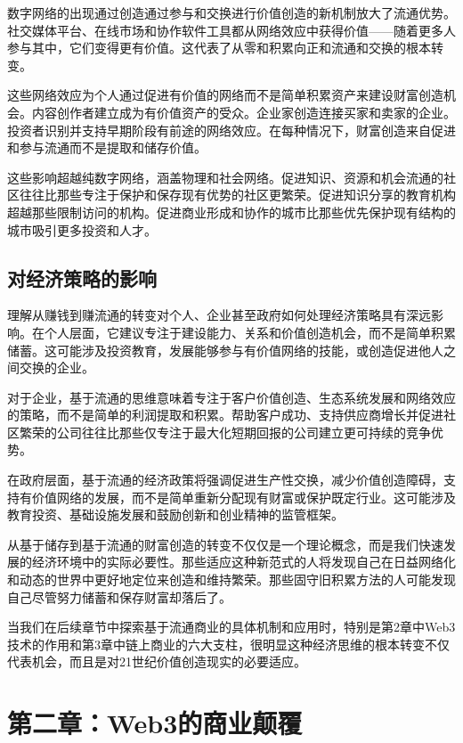 \documentclass[
  Letterpaper,
]{scrbook}
\begin{document}
数字网络的出现通过创造通过参与和交换进行价值创造的新机制放大了流通优势。社交媒体平台、在线市场和协作软件工具都从网络效应中获得价值------随着更多人参与其中，它们变得更有价值。这代表了从零和积累向正和流通和交换的根本转变。

这些网络效应为个人通过促进有价值的网络而不是简单积累资产来建设财富创造机会。内容创作者建立成为有价值资产的受众。企业家创造连接买家和卖家的企业。投资者识别并支持早期阶段有前途的网络效应。在每种情况下，财富创造来自促进和参与流通而不是提取和储存价值。

这些影响超越纯数字网络，涵盖物理和社会网络。促进知识、资源和机会流通的社区往往比那些专注于保护和保存现有优势的社区更繁荣。促进知识分享的教育机构超越那些限制访问的机构。促进商业形成和协作的城市比那些优先保护现有结构的城市吸引更多投资和人才。

\section{对经济策略的影响}\label{ux5bf9ux7ecfux6d4eux7b56ux7565ux7684ux5f71ux54cd}

理解从赚钱到赚流通的转变对个人、企业甚至政府如何处理经济策略具有深远影响。在个人层面，它建议专注于建设能力、关系和价值创造机会，而不是简单积累储蓄。这可能涉及投资教育，发展能够参与有价值网络的技能，或创造促进他人之间交换的企业。

对于企业，基于流通的思维意味着专注于客户价值创造、生态系统发展和网络效应的策略，而不是简单的利润提取和积累。帮助客户成功、支持供应商增长并促进社区繁荣的公司往往比那些仅专注于最大化短期回报的公司建立更可持续的竞争优势。

在政府层面，基于流通的经济政策将强调促进生产性交换，减少价值创造障碍，支持有价值网络的发展，而不是简单重新分配现有财富或保护既定行业。这可能涉及教育投资、基础设施发展和鼓励创新和创业精神的监管框架。

从基于储存到基于流通的财富创造的转变不仅仅是一个理论概念，而是我们快速发展的经济环境中的实际必要性。那些适应这种新范式的人将发现自己在日益网络化和动态的世界中更好地定位来创造和维持繁荣。那些固守旧积累方法的人可能发现自己尽管努力储蓄和保存财富却落后了。

当我们在后续章节中探索基于流通商业的具体机制和应用时，特别是第2章中Web3技术的作用和第3章中链上商业的六大支柱，很明显这种经济思维的根本转变不仅代表机会，而且是对21世纪价值创造现实的必要适应。

\chapter{第二章：Web3的商业颠覆}\label{sec-web3-disruption}
\end{document}
